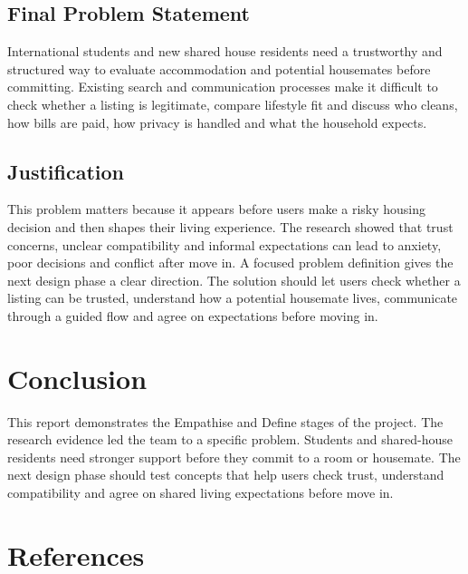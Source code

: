 \documentclass[11pt,a4paper]{article}
\begin{document}
\subsection{Final Problem Statement}

International students and new shared house residents need a trustworthy and structured way to evaluate accommodation and potential housemates before committing. Existing search and communication processes make it difficult to check whether a listing is legitimate, compare lifestyle fit and discuss who cleans, how bills are paid, how privacy is handled and what the household expects.

\subsection{Justification}

This problem matters because it appears before users make a risky housing decision and then shapes their living experience. The research showed that trust concerns, unclear compatibility and informal expectations can lead to anxiety, poor decisions and conflict after move in. A focused problem definition gives the next design phase a clear direction. The solution should let users check whether a listing can be trusted, understand how a potential housemate lives, communicate through a guided flow and agree on expectations before moving in.

\section{Conclusion}

This report demonstrates the Empathise and Define stages of the project. The research evidence led the team to a specific problem. Students and shared-house residents need stronger support before they commit to a room or housemate. The next design phase should test concepts that help users check trust, understand compatibility and agree on shared living expectations before move in.

\newpage
\section{References}
\end{document}

